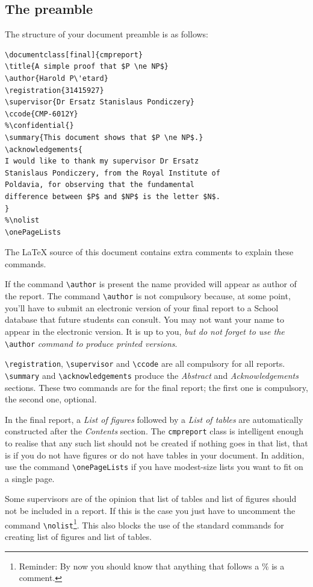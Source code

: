 \documentclass[review]{cmpreport}
\begin{document}
\subsection{The preamble}

The structure of your document preamble is as follows:
\begin{verbatim}
\documentclass[final]{cmpreport}
\title{A simple proof that $P \ne NP$}
\author{Harold P\'etard}
\registration{31415927}
\supervisor{Dr Ersatz Stanislaus Pondiczery}
\ccode{CMP-6012Y}
%\confidential{}
\summary{This document shows that $P \ne NP$.}
\acknowledgements{
I would like to thank my supervisor Dr Ersatz 
Stanislaus Pondiczery, from the Royal Institute of 
Poldavia, for observing that the fundamental 
difference between $P$ and $NP$ is the letter $N$.
}
%\nolist
\onePageLists
\end{verbatim}
The \LaTeX{} source of this document contains extra comments to explain these commands.

If the command \verb/\author/ is present the name provided will appear as author of the report. The command \verb/\author/ is not compulsory because, at some point, you'll have  to submit an electronic  version of your final report to a School database that future students can consult. You may not want your name to appear in the electronic version. It is up to you, \emph{but do not forget to use the} \verb/\author/ \emph{command to produce printed versions}.

\verb/\registration/, \verb/\supervisor/ and \verb/\ccode/ are all compulsory for all reports. \verb/\summary/ and \verb/\acknowledgements/ produce the \emph{Abstract} and \emph{Acknowledgements} sections. These two commands are for the final report; the first one is compulsory, the second one, optional.

In the final report, a \emph{List of figures} followed by a \emph{List of tables} are automatically constructed after the \emph{Contents} section. The \verb/cmpreport/ class is intelligent enough to realise that any such list should not be created if nothing goes in that list, that is if you do not have figures or do not have tables in your document. In addition, use the command \verb/\onePageLists/ if you have modest-size lists you want to fit on a single page.

Some supervisors are of the opinion that list of tables and list of figures should not be included in a report. If this is the case you just have to uncomment the command \verb/\nolist/\footnote{Reminder: By now you should know that anything that follows a \% is a comment.}. This also blocks the use of the standard \LaTeXe{} commands for creating list of figures and list of tables. 
\end{document}
